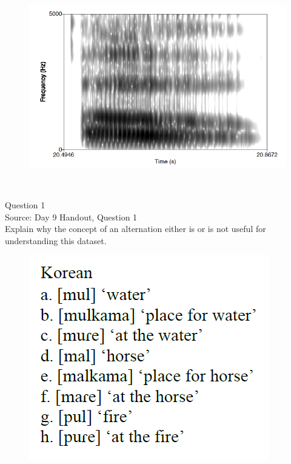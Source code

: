 \documentclass[12pt]{article}
\begin{document}
\begin{figure}[H]
\includegraphics{../images/spectrogram_oh.png}
\end{figure}

\newpage

\begin{center}
\textbf{{\color{red}{\HUGE END OF EXAM}}}\\

\end{center}
\newpage

\begin{center}
\textbf{{\color{blue}{\HUGE START OF EXAM\\}}}

\textbf{{\color{blue}{\HUGE Student ID: 1743\\}}}

\textbf{{\color{blue}{\HUGE 3:20 - 3:40 PM\\}}}

\end{center}
\newpage

{\large Question 1}\\

Source: Day 9 Handout, Question 1\\

Explain why the concept of an alternation either is or is not useful for understanding this dataset.\\

\begin{figure}[H]
\includegraphics{../images/korean.png}
\end{figure}
\end{document}
